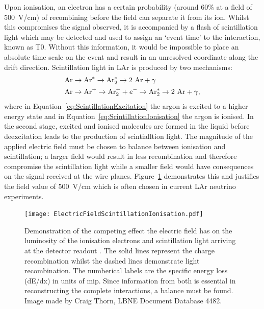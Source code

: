 Upon ionisation, an electron has a certain probability (around 60\% at a field of 500~V/cm) of recombining before the field can separate it from its ion.  Whilst this compromises the signal observed, it is accompanied by a flash of scintillation light which may be detected and used to assign an `event time' to the interaction, known as T0.  Without this information, it would be impossible to place an absolute time scale on the event and result in an unresolved coordinate along the drift direction.  Scintillation light in LAr is produced by two mechanisms:
\begin{align}
  \label{eq:ScintillationExcitation} \textnormal{Ar} &\rightarrow \textnormal{Ar}^* \rightarrow \textnormal{Ar}_2^* \rightarrow 2~\textnormal{Ar} + \gamma \\
  \label{eq:ScintillationIonisation} \textnormal{Ar} &\rightarrow \textnormal{Ar}^+ \rightarrow \textnormal{Ar}_2^+ + e^- \rightarrow \textnormal{Ar}_2^* \rightarrow 2~\textnormal{Ar} + \gamma ,
\end{align}
where in Equation~\ref{eq:ScintillationExcitation} the argon is excited to a higher energy state and in Equation~\ref{eq:ScintillationIonisation} the argon is ionised.  In the second stage, excited and ionised molecules are formed in the liquid before deexcitation leads to the production of scintialltion light.  The magnitude of the applied electric field must be chosen to balance between ionisation and scintillation; a larger field would result in less recombination and therefore compromise the scintillation light while a smaller field would have consequences on the signal received at the wire planes.  Figure~\ref{fig:ElectricFieldScintillationIonisation} demonstrates this and justifies the field value of 500~V/cm which is often chosen in current LAr neutrino experiments.

\begin{figure}
  \centering
  \texttt{[image: ElectricFieldScintillationIonisation.pdf]}
  \caption[Effect of electric field on luminosity of ionisation electrons and scintillation light in a LArTPC.]{Demonstration of the competing effect the electric field has on the luminosity of the ionisation electrons and scintillation light arriving at the detector readout \cite{Thomas1987,Amoruso2004,Kubota1978}.  The solid lines represent the charge recombination whilst the dashed lines demonstrate light recombination.  The numberical labels are the specific energy loss (dE/dx) in units of mip.  Since information from both is essential in reconstructing the complete interactions, a balance must be found.  Image made by Craig Thorn, LBNE Document Database 4482.}
  \label{fig:ElectricFieldScintillationIonisation}
\end{figure}


